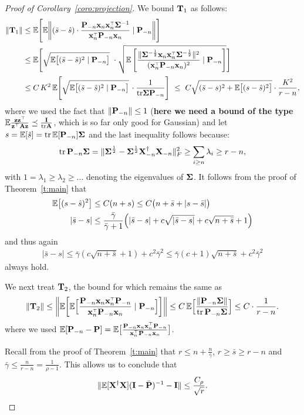\documentclass[11pt]{article}
\begin{document}
\begin{proof}[Proof of Corollary~\ref{coro:projection}]
We bound $\T_1$ as follows:
\begin{align*}
  \|\T_1\|
  &\leq \E\Bigg[\E\bigg\|(\bar s-\hat
  s)\cdot\frac{\P_{-n}\x_n\x_n^\top \Sigmab^{-1} }{\x_n^\top\P_{-n}\x_n}\mid
  \P_{-n}\bigg\|\Bigg]\\
  &\leq \E\Bigg[\sqrt{\E\big[(\bar s - \hat
  s)^2\mid
    \P_{-n}\big]}\
    \cdot \sqrt{\E \left[\frac{\| \Sigmab^{-\frac12} \x_n \x_n^\top \Sigmab^{-\frac12} \|^2}{ (\x_n^\top \P_{-n} \x_n)^2 }\mid \P_{-n}\right]} \Bigg]\\
  &\leq  C\,K^2\,\E\Bigg[\sqrt{\E\big[(\bar s - \hat
  s)^2\mid
    \P_{-n}\big]}\,
    \cdot \frac1{\tr \Sigmab \P_{-n} } \Bigg] %
    \  \leq\ C\sqrt{(\bar s - s)^2 + \E\big[(s - \hat s)^2\big]}\cdot \frac{K^2}{r-n},
\end{align*}
where we used the fact that $\| \P_{-n} \| \le 1$ (\textbf{here we need a bound of the type $\E \frac{\z \z^\top}{\z^\top \A \z} \preceq \frac{\I}{\tr \A}$}, which is so far only good for Gaussian) and let $s=\E[\hat s]=\tr\,\E[\P_{-n}]\Sigmab$ and the last
inequality follows because:
\begin{align*}
    \tr\,\P_{-n}\Sigmab =
    \|\Sigmab^{\frac12}-\Sigmab^{\frac12}\X_{-n}^\dagger\X_{-n}\|_F^2\geq
\sum_{i\geq n}\lambda_i\geq r-n,
\end{align*}
with $1=\lambda_1\geq\lambda_2\geq...$ denoting the eigenvalues of $\Sigmab$. It follows from the proof of Theorem~\ref{t:main} that
\begin{align*}
  \E\big[(s - \hat s)^2\big] &\le C(n+s)\leq C\big(n+\bar s + |s- \bar s|\big) \\
  |\bar s - s|&\leq \frac{\bar\gamma}{\bar\gamma+1}\Big(|\bar s- s| + c\sqrt{|\bar s- s|} + c\sqrt{n+\bar s} + 1\Big)
\end{align*}
and thus again
\begin{align*}
  |\bar s-s|\leq
  \bar\gamma(c\sqrt{n+\bar s}+1) + c^2\bar\gamma^2\leq \bar\gamma
  (c+1)\sqrt{n+\bar s} + c^2\bar\gamma^2
\end{align*}
always hold.

We next treat $\T_2$, the bound for which remains the same as
\begin{align*}
\|\T_2\|\leq  \bigg\|
  \E\bigg[\E\Big[\frac{\P_{-n}\x_n\x_n^\top\P_{-n}}{\x_n^\top\P_{-n}\x_n}
  \mid \P_{-n}\Big]\bigg]\bigg\|  \leq C\,\E\Big[\frac{\|\P_{-n}\Sigmab\|}{\tr\,\P_{-n}\Sigmab}\Big]   
\leq C\cdot \frac1{r-n}.
\end{align*}
where we used $\E[\P_{-n}-\P] = \E\big[\frac{\P_{-n}\x_n\x_n^\top\P_{-n}}{\x_n^\top\P_{-n}\x_n}\big]$.

Recall from the proof of Theorem~\ref{t:main} that $r \le n + \frac{n}{\bar \gamma}$, $r\geq\bar s \geq r-n$ and $\bar\gamma\leq
\frac{n}{r-n}=\frac1{\rho-1}$. This allows us to conclude that
\[
  \| \E[\X^\dagger\X] (\I - \bar \P)^{-1} - \I \| \le \frac{C_\rho}{\sqrt r}.
\]
\end{proof}
\end{document}
